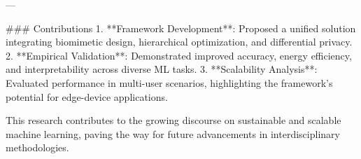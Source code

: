---

### Contributions  
1. **Framework Development**: Proposed a unified solution integrating biomimetic design, hierarchical optimization, and differential privacy.
2. **Empirical Validation**: Demonstrated improved accuracy, energy efficiency, and interpretability across diverse ML tasks.
3. **Scalability Analysis**: Evaluated performance in multi-user scenarios, highlighting the framework's potential for edge-device applications.

This research contributes to the growing discourse on sustainable and scalable machine learning, paving the way for future advancements in interdisciplinary methodologies.